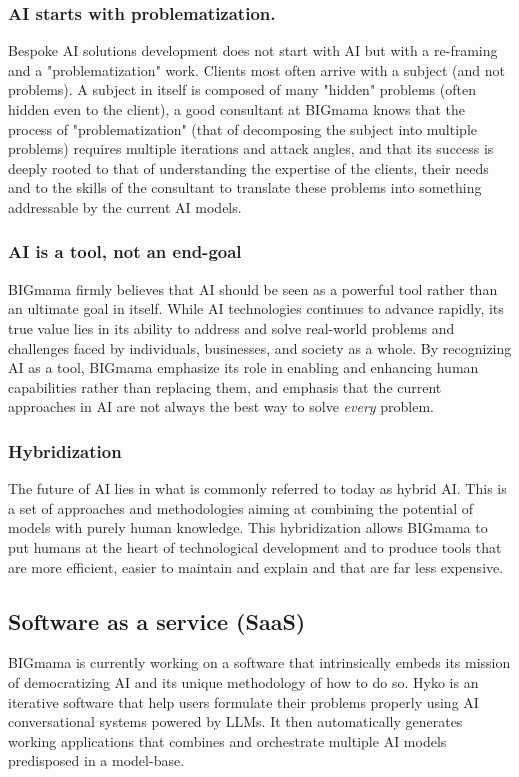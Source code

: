 \documentclass[a4paper,12pt]{article}
\begin{document}
\subsubsection{AI starts with problematization.}
Bespoke AI solutions development does not start with AI but with a re-framing and a "problematization" work. 
Clients most often arrive with a subject (and not problems). A subject in itself is composed of many "hidden" problems (often hidden even to the client), 
a good consultant at BIGmama knows that the process of "problematization" (that of decomposing the subject into multiple problems) requires multiple iterations and attack angles, 
and that its success is deeply rooted to that of understanding the expertise of the clients, their needs and to the skills of the consultant to translate these problems into something addressable 
by the current AI models.

\subsubsection{AI is a tool, not an end-goal}
BIGmama firmly believes that AI should be seen as a powerful tool rather than an ultimate goal in itself. While AI technologies continues to advance rapidly, 
its true value lies in its ability to address and solve real-world problems and challenges faced by individuals, businesses, and society as a whole.
By recognizing AI as a tool, BIGmama emphasize its role in enabling and enhancing human capabilities rather than replacing them, and emphasis that the current 
approaches in AI are not always the best way to solve \textit{every} problem.

\subsubsection{Hybridization}
The future of AI lies in what is commonly referred to today as hybrid AI. 
This is a set of approaches and methodologies aiming at combining the potential of models with purely human knowledge. 
This hybridization allows BIGmama to put humans at the heart of technological development and to produce tools that are more efficient, easier to maintain and 
explain and that are far less expensive.

\subsection{Software as a service (SaaS)}
BIGmama is currently working on a software that intrinsically embeds its mission of democratizing AI and its unique methodology of how to do so. 
Hyko is an iterative software that help users formulate their problems properly using AI conversational systems powered by LLMs. 
It then automatically generates working applications that combines and orchestrate multiple AI models predisposed in a model-base.
\end{document}
